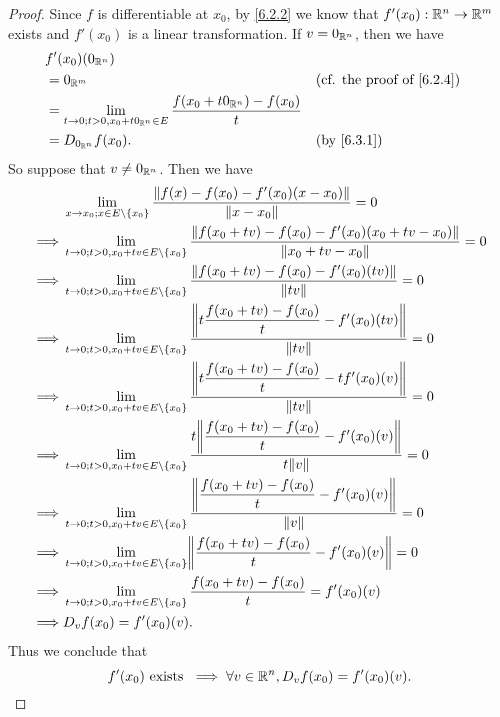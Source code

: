 \begin{proof}
  Since \(f\) is differentiable at \(x_0\), by \cref{6.2.2} we know that \(f'(x_0) : \mathbb{R}^n \to \mathbb{R}^m\) exists and \(f'(x_0)\) is a linear transformation.
  If \(v = 0_{\mathbb{R}^n}\), then we have
  \begin{align*}
     & f'(x_0)(0_{\R^n})                                                                                                                    \\
     & = 0_{\R^m}                                                                               &  & \text{(cf. the proof of \cref{6.2.4})} \\
     & = \lim_{t \to 0 ; t > 0, x_0 + t 0_{\R^n} \in E} \dfrac{f(x_0 + t 0_{\R^n}) - f(x_0)}{t}                                             \\
     & = D_{0_{\R^n}} f(x_0).                                                                   &  & \by{6.3.1}
  \end{align*}
  So suppose that \(v \neq 0_{\mathbb{R}^n}\).
  Then we have
  \begin{align*}
             & \lim_{x \to x_0 ; x \in E \setminus \set{x_0}} \dfrac{\norm*{f(x) - f(x_0) - f'(x_0)(x - x_0)}}{\norm*{x - x_0}} = 0                                  \\
    \implies & \lim_{t \to 0 ; t > 0, x_0 + tv \in E \setminus \set{x_0}} \dfrac{\norm*{f(x_0 + tv) - f(x_0) - f'(x_0)(x_0 + tv - x_0)}}{\norm*{x_0 + tv - x_0}} = 0 \\
    \implies & \lim_{t \to 0 ; t > 0, x_0 + tv \in E \setminus \set{x_0}} \dfrac{\norm*{f(x_0 + tv) - f(x_0) - f'(x_0)(tv)}}{\norm*{tv}} = 0                         \\
    \implies & \lim_{t \to 0 ; t > 0, x_0 + tv \in E \setminus \set{x_0}} \dfrac{\norm*{t \dfrac{f(x_0 + tv) - f(x_0)}{t} - f'(x_0)(tv)}}{\norm*{tv}} = 0            \\
    \implies & \lim_{t \to 0 ; t > 0, x_0 + tv \in E \setminus \set{x_0}} \dfrac{\norm*{t \dfrac{f(x_0 + tv) - f(x_0)}{t} - t f'(x_0)(v)}}{\norm*{tv}} = 0           \\
    \implies & \lim_{t \to 0 ; t > 0, x_0 + tv \in E \setminus \set{x_0}} \dfrac{t \norm*{\dfrac{f(x_0 + tv) - f(x_0)}{t} - f'(x_0)(v)}}{t \norm*{v}} = 0            \\
    \implies & \lim_{t \to 0 ; t > 0, x_0 + tv \in E \setminus \set{x_0}} \dfrac{\norm*{\dfrac{f(x_0 + tv) - f(x_0)}{t} - f'(x_0)(v)}}{\norm*{v}} = 0                \\
    \implies & \lim_{t \to 0 ; t > 0, x_0 + tv \in E \setminus \set{x_0}} \norm*{\dfrac{f(x_0 + tv) - f(x_0)}{t} - f'(x_0)(v)} = 0                                   \\
    \implies & \lim_{t \to 0 ; t > 0, x_0 + tv \in E \setminus \set{x_0}} \dfrac{f(x_0 + tv) - f(x_0)}{t} = f'(x_0)(v)                                               \\
    \implies & D_v f(x_0) = f'(x_0)(v).
  \end{align*}
  Thus we conclude that
  \[
    f'(x_0) \text{ exists } \implies \forall v \in \mathbb{R}^n, D_v f(x_0) = f'(x_0)(v).
  \]
\end{proof}

